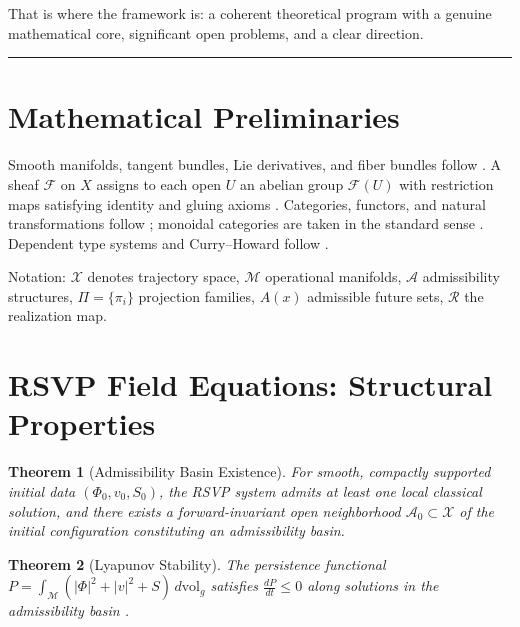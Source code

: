 \documentclass[12pt, a4paper]{article}
\theoremstyle{rsvpstyle}
\newtheorem{theorem}{Theorem}[section]
\theoremstyle{definition}
\newcommand{\Traj}{\mathcal{X}}
\newcommand{\OpMan}{\mathcal{M}}
\newcommand{\Adm}{\mathcal{A}}
\newcommand{\ProjFam}{\Pi}
\newcommand{\Persist}{P}
\newcommand{\Real}{\mathcal{R}}
\begin{document}
That is where the framework is: a coherent theoretical program with a genuine
mathematical core, significant open problems, and a clear direction.

\bigskip
\noindent\rule{\textwidth}{0.4pt}


\clearpage
\appendix
\renewcommand{\thesection}{\Alph{section}}
\titleformat{\section}{\large\bfseries\color{accentgold}}{\appendixname~\thesection.}{0.8em}{}

\section{Mathematical Preliminaries}

Smooth manifolds, tangent bundles, Lie derivatives, and fiber bundles
follow \citet{Lee2013,Spivak1999}. A sheaf $\mathcal{F}$ on $X$ assigns to
each open $U$ an abelian group $\mathcal{F}(U)$ with restriction maps
satisfying identity and gluing axioms \citep{Godement1958}. Categories,
functors, and natural transformations follow \citet{MacLane1998}; monoidal
categories are taken in the standard sense \citep{MacLane1998}. Dependent
type systems and Curry--Howard follow \citet{CurryHoward}.

Notation: $\Traj$ denotes trajectory space, $\OpMan$ operational manifolds,
$\Adm$ admissibility structures, $\ProjFam = \{\pi_i\}$ projection families,
$A(x)$ admissible future sets, $\Real$ the realization map.

\section{RSVP Field Equations: Structural Properties}

\begin{theorem}[Admissibility Basin Existence]
For smooth, compactly supported initial data $(\Phi_0, v_0, S_0)$, the RSVP
system admits at least one local classical solution, and there exists a
forward-invariant open neighborhood $\Adm_0 \subset \Traj$ of the initial
configuration constituting an admissibility basin.
\end{theorem}

\begin{theorem}[Lyapunov Stability]
The persistence functional $\Persist = \int_\OpMan (|\Phi|^2 + |v|^2 + S)\,d\mathrm{vol}_g$
satisfies $\frac{d\Persist}{dt} \leq 0$ along solutions in the admissibility basin \citep{Arnold1989}.
\end{theorem}
\end{document}
